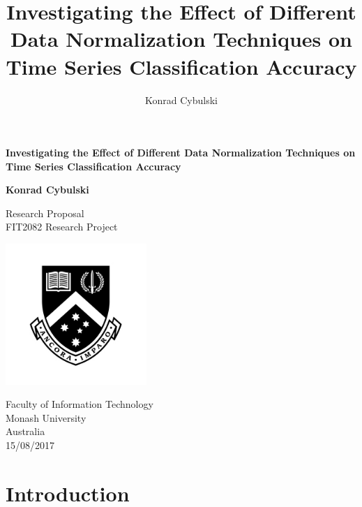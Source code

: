 \documentclass[10pt,a4paper]{article}
\author{Konrad Cybulski}
\title{Investigating the Effect of Different Data Normalization Techniques on Time Series Classification Accuracy}
\begin{document}
\begin{titlepage}
    \begin{center}
        \vspace*{1cm}
        
        \LARGE
        \textbf{Investigating the Effect of Different Data Normalization Techniques on Time Series Classification Accuracy}
        
        \vspace{4cm}
        
		\Large 
        
        \textbf{Konrad Cybulski}
        
        
        \LARGE
        \vspace{2cm}

        
        
        \vfill
        
        
        
        Research Proposal \\
        FIT2082 Research Project
        
        
        \includegraphics[width=0.4\textwidth]{Images/monash_emblem.jpg}
              
        
        \large
        Faculty of Information Technology\\
        Monash University\\
        Australia\\
        15/08/2017
        
    \end{center}
\end{titlepage}

\pagebreak
\tableofcontents
\pagebreak

\section{Introduction} 
\end{document}
